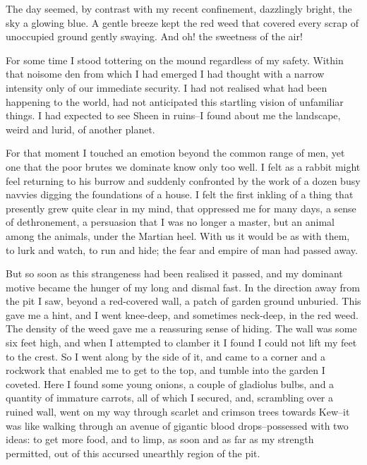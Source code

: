 The day seemed, by contrast with my recent confinement, dazzlingly
bright, the sky a glowing blue. A gentle breeze kept the red weed
that covered every scrap of unoccupied ground gently swaying. And
oh! the sweetness of the air!

For some time I stood tottering on the mound regardless of my
safety. Within that noisome den from which I had emerged I had
thought with a narrow intensity only of our immediate security. I
had not realised what had been happening to the world, had not
anticipated this startling vision of unfamiliar things. I had
expected to see Sheen in ruins--I found about me the landscape,
weird and lurid, of another planet.

For that moment I touched an emotion beyond the common range of
men, yet one that the poor brutes we dominate know only too well. I
felt as a rabbit might feel returning to his burrow and suddenly
confronted by the work of a dozen busy navvies digging the
foundations of a house. I felt the first inkling of a thing that
presently grew quite clear in my mind, that oppressed me for many
days, a sense of dethronement, a persuasion that I was no longer a
master, but an animal among the animals, under the Martian heel.
With us it would be as with them, to lurk and watch, to run and
hide; the fear and empire of man had passed away.

But so soon as this strangeness had been realised it passed, and my
dominant motive became the hunger of my long and dismal fast. In
the direction away from the pit I saw, beyond a red-covered wall, a
patch of garden ground unburied. This gave me a hint, and I went
knee-deep, and sometimes neck-deep, in the red weed. The density of
the weed gave me a reassuring sense of hiding. The wall was some
six feet high, and when I attempted to clamber it I found I could
not lift my feet to the crest. So I went along by the side of it,
and came to a corner and a rockwork that enabled me to get to the
top, and tumble into the garden I coveted. Here I found some young
onions, a couple of gladiolus bulbs, and a quantity of immature
carrots, all of which I secured, and, scrambling over a ruined
wall, went on my way through scarlet and crimson trees towards
Kew--it was like walking through an avenue of gigantic blood
drops--possessed with two ideas: to get more food, and to limp, as
soon and as far as my strength permitted, out of this accursed
unearthly region of the pit.

